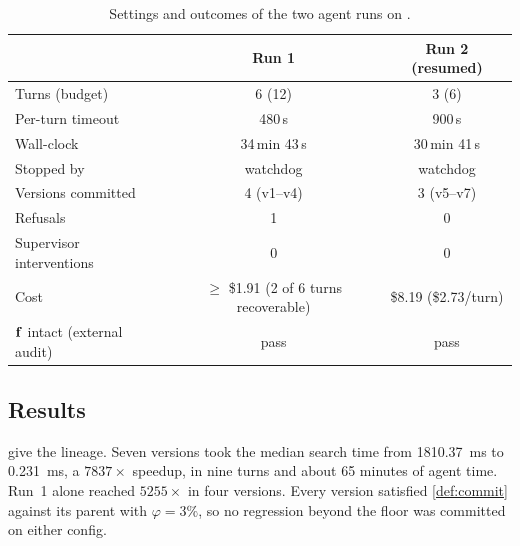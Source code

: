 \begin{table}[t]
\centering\small
\caption{Settings and outcomes of the two agent runs on .}
\label{tab:runs}
\begin{tabular}{@{}lcc@{}}
\toprule
 & Run 1 & Run 2 (resumed) \\
\midrule
Turns (budget)            & 6 (12) & 3 (6) \\
Per-turn timeout          & 480\,s & 900\,s \\
Wall-clock                & 34\,min 43\,s & 30\,min 41\,s \\
Stopped by                & watchdog & watchdog \\
Versions committed        & 4 (v1--v4) & 3 (v5--v7) \\
Refusals                  & 1 & 0 \\
Supervisor interventions  & 0 & 0 \\
Cost                      & $\geq$ \$1.91 (2 of 6 turns recoverable) & \$8.19 (\$2.73/turn) \\
$\mathbf{f}$ intact (external audit) & pass & pass \\
\bottomrule
\end{tabular}
\end{table}

\subsection{Results}

 give the lineage. Seven versions took the median search time from
\SI{1810.37}{ms} to \SI{0.231}{ms}, a $7837\times$ speedup, in nine turns and about 65 minutes of
agent time. Run~1 alone reached $5255\times$ in four versions. Every version satisfied
\cref{def:commit} against its parent with $\varphi = 3\%$, so no regression beyond the floor
was committed on either config.

